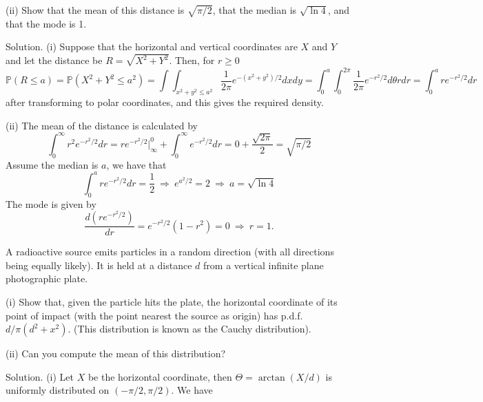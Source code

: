 (ii) Show that the mean of this distance is $\sqrt{\pi/2}$, that the median is $\sqrt{\ln 4}$, and that the mode is 1.



Solution. (i) Suppose that the horizontal and vertical coordinates are $X$ and $Y$ and let the distance be $R=\sqrt{X^2+Y^2}$. Then, for $r\geq 0$
\begin{equation}
\mathbb{P}(R\leq a) = \mathbb{P}(X^2+Y^2\leq a^2) = \int\int_{x^2+y^2\leq a^2}\frac{1}{2\pi}e^{-(x^2+y^2)/2}dxdy = \int^a_0\int^{2\pi}_0\frac{1}{2\pi}e^{-r^2/2}d\theta r dr = \int^a_0 re^{-r^2/2}dr
\end{equation}
after transforming to polar coordinates, and this gives the required density.

(ii) The mean of the distance is calculated by 
\begin{equation}
\int^\infty_0 r^2e^{-r^2/2}dr = re^{-r^2/2}|^0_\infty + \int^\infty_0 e^{-r^2/2}dr = 0+ \frac{\sqrt{2\pi}}{2} = \sqrt{\pi/2}
\end{equation}
Assume the median is $a$, we have that 
\begin{equation}
\int^a_0 re^{-r^2/2}dr = \frac 12 \ \Rightarrow\ e^{a^2/2} = 2 \ \Rightarrow \ a=\sqrt{\ln 4}
\end{equation}
\vspace{2mm}
The mode is given by
\begin{equation}
\frac{d\left(re^{-r^2/2}\right)}{dr} = e^{-r^2/2} (1-r^2) = 0 \ \Rightarrow \ r=1.
\end{equation}


\item A radioactive source emits particles in a random direction (with all directions being equally likely). It is held at a distance $d$ from a vertical infinite plane photographic plate.

(i) Show that, given the particle hits the plate, the horizontal coordinate of its point of impact (with the point nearest the source as origin) has p.d.f. $d/\pi(d^2+x^2)$. (This distribution is known as the Cauchy distribution).

(ii) Can you compute the mean of this distribution?



Solution. (i) Let $X$ be the horizontal coordinate, then $\Theta=\arctan(X/d)$ is uniformly distributed on $(-\pi/2,\pi/2)$. We have


